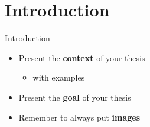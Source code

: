 \documentclass{beamer}
\begin{document}
	\section{Introduction}
	\begin{frame}{Introduction}
		\vspace{\baselineskip}
		
		\begin{overlayarea}{\textwidth}{10cm}
			\begin{itemize}
				\item<1-> Present the \textbf{context} of your thesis
				\begin{itemize}
					\item<2-> with examples
				\end{itemize}
				\item<3-> Present the \textbf{goal} of your thesis
				\item<4-> Remember to always put \textbf{images}
			\end{itemize}
			\begin{figure}[t]
\end{figure}
\end{overlayarea}
\end{frame}
\end{document}
